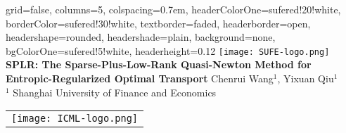 \documentclass[a0paper,landscape]{baposter}
\begin{document}
    \begin{poster}
    {
        grid=false,
        columns=5,
        colspacing=0.7em,
        headerColorOne=sufered!20!white,
        borderColor=sufered!30!white,
        textborder=faded,
        headerborder=open,
        headershape=rounded,
        headershade=plain,
        background=none,
        bgColorOne=sufered!5!white,
        headerheight=0.12\textheight
    }
    {
        \texttt{[image: SUFE-logo.png]}
    }
    {\sc\huge\bf SPLR: The Sparse-Plus-Low-Rank Quasi-Newton Method for Entropic-Regularized Optimal Transport}
    {
        \vspace{0.3em}
        Chenrui Wang$^1$, Yixuan Qiu$^1$ \\[0.2em]
        $^1$ Shanghai University of Finance and Economics \\[0.2em]
    }
    {
        \begin{tabular}{r}
            \texttt{[image: ICML-logo.png]}
        \end{tabular}
    }

    
    
    
    
    
    

    \end{poster}
\end{document}
